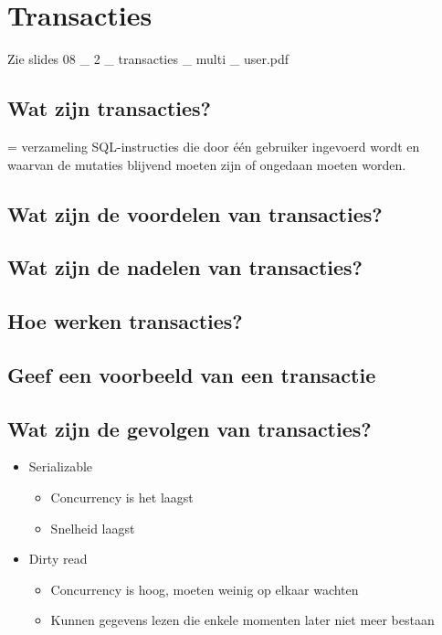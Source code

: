 \newpage

\section{Transacties}

Zie slides 08 \_ 2 \_ transacties \_ multi \_ user.pdf

\subsection{Wat zijn transacties?}

= verzameling SQL-instructies die door één gebruiker ingevoerd wordt en waarvan de mutaties blijvend moeten zijn of ongedaan moeten worden.

\subsection{Wat zijn de voordelen van transacties?}

\subsection{Wat zijn de nadelen van transacties?}

\subsection{Hoe werken transacties?}

\subsection{Geef een voorbeeld van een transactie}

\subsection{Wat zijn de gevolgen van transacties?}

\begin{itemize}
\item Serializable
    \begin{itemize}
        \item Concurrency is het laagst
        \item Snelheid laagst
    \end{itemize}
\item Dirty read
    \begin{itemize}
        \item Concurrency is hoog, moeten weinig op elkaar wachten
        \item Kunnen gegevens lezen die enkele momenten later niet meer bestaan
    \end{itemize}
\end{itemize}
